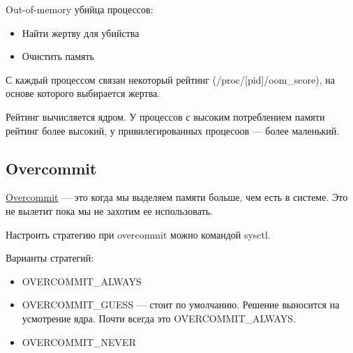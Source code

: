 Out-of-memory убийца процессов:
\begin{itemize}
	\item Найти жертву для убийства
	\item Очистить память
\end{itemize}

С каждый процессом связан некоторый рейтинг (/proc/[pid]/oom\_score), на основе которого
выбирается жертва.

Рейтинг вычисляется ядром. У процессов с высоким потреблением памяти рейтинг более
высокий, у привилегированных процесоов --- более маленький.

\subsection{Overcommit}

\begin{Def}
	\underline{Overcommit} --- это когда мы выделяем памяти больше, чем есть в системе.
	Это не вылетит пока мы не захотим ее использовать.
\end{Def}

Настроить стратегию при overcommit можно командой sysctl. 

Варианты стратегий:
\begin{itemize}
	\item OVERCOMMIT\_ALWAYS
	\item OVERCOMMIT\_GUESS --- стоит по умолчанию. Решение выносится на
	усмотрение ядра. Почти всегда это OVERCOMMIT\_ALWAYS.
	\item OVERCOMMIT\_NEVER
\end{itemize}
